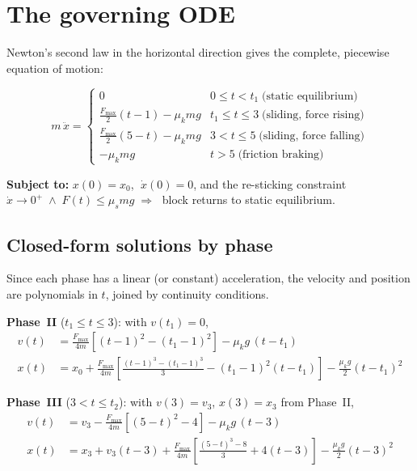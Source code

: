 \documentclass[11pt, a4paper]{article}
\begin{document}
\section{The governing ODE}
\label{sec:ode}

Newton's second law in the horizontal direction gives the complete,
piecewise equation of motion:

\begin{tcolorbox}[colback=accentred!5, colframe=accentred!70!black, title=Master Equation of Motion]
\begin{equation}
\boxed{
m\,\ddot{x} =
\begin{cases}
0 & 0 \le t < t_1 \;\text{(static equilibrium)} \\[6pt]
\displaystyle \frac{F_{\max}}{2}(t-1) - \mu_k m g & t_1 \le t \le 3 \;\text{(sliding, force rising)} \\[8pt]
\displaystyle \frac{F_{\max}}{2}(5-t) - \mu_k m g & 3 < t \le 5 \;\text{(sliding, force falling)} \\[8pt]
-\mu_k m g & t > 5 \;\text{(friction braking)}
\end{cases}
}
\label{eq:master}
\end{equation}

\medskip
\noindent
\textbf{Subject to:} \;$x(0) = x_0$, $\;\dot{x}(0) = 0$, and the
re-sticking constraint $\dot{x} \to 0^+ \;\wedge\; F(t) \le \mu_s mg
\;\Rightarrow\;$ block returns to static equilibrium.
\end{tcolorbox}

\subsection{Closed-form solutions by phase}

Since each phase has a linear (or constant) acceleration, the velocity
and position are polynomials in $t$, joined by continuity conditions.

\medskip
\noindent
\textbf{Phase~II} ($t_1 \le t \le 3$): with $v(t_1) = 0$,
\begin{align}
v(t) &= \frac{F_{\max}}{4m}\left[(t-1)^2 - (t_1-1)^2\right] - \mu_k g\,(t - t_1)
\label{eq:v_phase2} \\[6pt]
x(t) &= x_0 + \frac{F_{\max}}{4m}\left[\frac{(t-1)^3 - (t_1-1)^3}{3} - (t_1-1)^2(t - t_1)\right] - \frac{\mu_k g}{2}(t - t_1)^2
\label{eq:x_phase2}
\end{align}

\medskip
\noindent
\textbf{Phase~III} ($3 < t \le t_2$): with $v(3) = v_3$, $x(3) = x_3$
from Phase~II,
\begin{align}
v(t) &= v_3 - \frac{F_{\max}}{4m}\left[(5-t)^2 - 4\right] - \mu_k g\,(t - 3)
\label{eq:v_phase3} \\[6pt]
x(t) &= x_3 + v_3(t-3) + \frac{F_{\max}}{4m}\left[\frac{(5-t)^3 - 8}{3} + 4(t-3)\right] - \frac{\mu_k g}{2}(t-3)^2
\label{eq:x_phase3}
\end{align}
\end{document}
